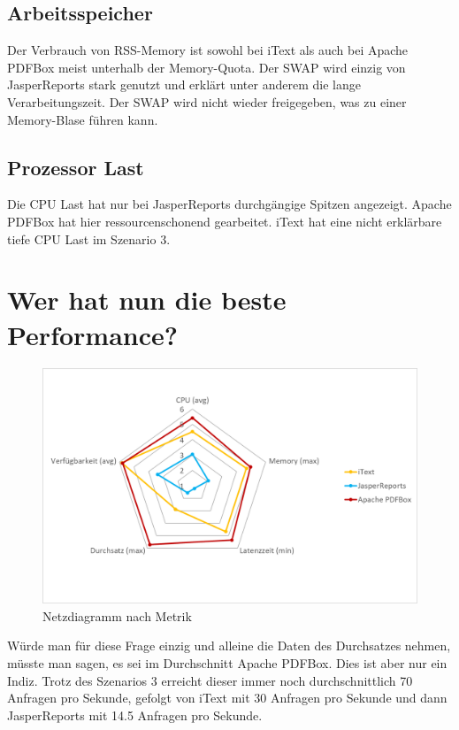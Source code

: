 \documentclass[main.tex]{subfiles}
\begin{document}
\subsection{Arbeitsspeicher}
Der Verbrauch von RSS-Memory ist sowohl bei iText als auch bei Apache PDFBox meist unterhalb der Memory-Quota. Der SWAP wird einzig von JasperReports stark genutzt und erklärt unter anderem die lange Verarbeitungszeit. Der SWAP wird nicht wieder freigegeben, was zu einer Memory-Blase führen kann.

\subsection{Prozessor Last}
Die CPU Last hat nur bei JasperReports durchgängige Spitzen angezeigt. Apache PDFBox hat hier ressourcenschonend gearbeitet. iText hat eine nicht erklärbare tiefe CPU Last im Szenario 3.


\section{Wer hat nun die beste Performance?}

\begin{figure}[!hb]
\includegraphics[width=\textwidth]{end/5_erfarhungsbericht/Netzdiagram.png}
 \caption{Netzdiagramm nach Metrik}
 \label{figure:netzdiagrammMetriken}
\end{figure}

Würde man für diese Frage einzig und alleine die Daten des Durchsatzes nehmen, müsste man sagen, es sei im Durchschnitt Apache PDFBox. Dies ist aber nur ein Indiz. Trotz des Szenarios 3 erreicht dieser immer noch durchschnittlich 70 Anfragen pro Sekunde, gefolgt von iText mit 30 Anfragen pro Sekunde und dann JasperReports mit 14.5 Anfragen pro Sekunde.
\end{document}
